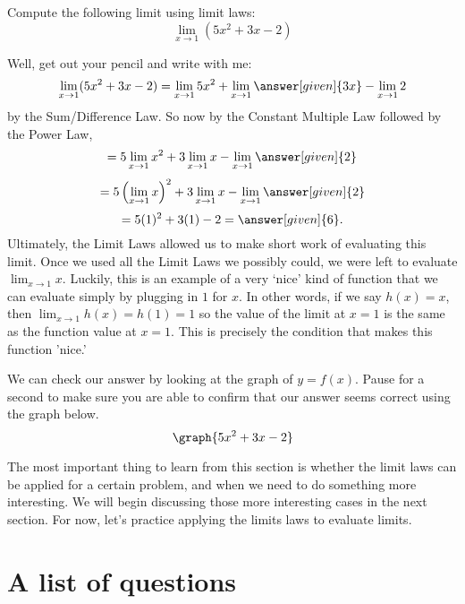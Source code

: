 \documentclass{ximera}
\begin{document}
\begin{example}
  Compute the following limit using limit laws:
  \[
  \displaystyle\lim_{x\to 1}(5x^2+3x-2)
  \]
\begin{explanation}
  Well, get out your pencil and write with me:
  \[
  \displaystyle\lim_{x\to 1} (5x^2+3x-2) = \lim_{x\to 1} 5x^2 + \lim_{x\to 1} \answer[given]{3x} - \lim_{x\to 1}2
  \]
  by the Sum/Difference Law. So now by the Constant Multiple Law followed by the Power Law, 
  \[
  = 5\displaystyle\lim_{x\to 1} x^2 + 3\lim_{x\to 1} x - \lim_{x\to 1}\answer[given]{2}
  \]
   \[
  = 5\left(\displaystyle\lim_{x\to 1} x\right)^2 + 3\lim_{x\to 1} x - \lim_{x\to 1}\answer[given]{2}
  \]
  \[
  = 5(1)^2 + 3(1) - 2 =\answer[given]{6}.
  \]
Ultimately, the Limit Laws allowed us to make short work of evaluating this limit.  Once we used all the Limit Laws we possibly could, we were left to evaluate $\displaystyle\lim_{x\to 1} x$.  Luckily, this is an example of a very `nice' kind of function that we can evaluate simply by plugging in $1$ for $x$.  In other words, if we say $h(x) = x$, then $\displaystyle\lim_{x\to 1} h(x) = h(1) = 1$ so the value of the limit at $x=1$ is the same as the function value at $x=1$.  This is precisely the condition that makes this function 'nice.'  \\

  \begin{prompt}
    We can check our answer by looking at the graph of $y=f(x)$.  Pause for a second to make sure you are able to confirm that our answer seems correct using the graph below. 
    \[
    \graph{5x^2+3x-2}
    \]
  \end{prompt}
\end{explanation}  
\end{example}


The most important thing to learn from this section is whether the
limit laws can be applied for a certain problem, and when we need to
do something more interesting.  We will begin discussing those more
interesting cases in the next section.  For now, let's practice applying the limits laws to evaluate limits.

\section{A list of questions}
\end{document}
